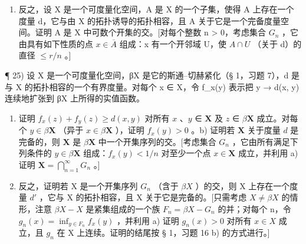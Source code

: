 \begin{enumerate}
\def\labelenumi{\alph{enumi})}
\setcounter{enumi}{1}
\tightlist
\item
  反之，设 X 是一个可度量化空间，A 是 X 的一个子集，使得 A 上存在一个度量 d，它与由 X 的拓扑诱导的拓扑相容，且 A 关于它是一个完备度量空间。证明 A 是 X 中可数个开集的交。{[}对每个整数 n \textgreater{} 0，考虑集合 \(G_{n}\) ，它由具有如下性质的点 \(x \in \overline{A}\) 组成：x 有一个开邻域 U，使 \(A \cap U\) （关于 d）的直径 \(\leqslant r/n\) 。{]}
\end{enumerate}

¶ 25) 设 X 是一个可度量化空间，βX 是它的斯通–切赫紧化（§ 1，习题 7），d 是与 X 的拓扑相容的一个有界度量。对每个 x ∈ X，令 f\_x(y) 表示把 y → d(x, y) 连续地扩张到 βX 上所得的实值函数。

\begin{enumerate}
\def\labelenumi{\alph{enumi})}
\item
  证明 \(f_{x}(z) + f_{y}(z) \geqslant d(x, y)\) 对所有 \(x\) 、\(y\) ∈ \(\mathbf{X}\) 及 \(z\) ∈ \(\beta \mathbf{X}\) 成立。对每个 \(y \in \beta \mathbf{X}\) （异于 \(x \in \beta \mathbf{X}\) ），证明 \(f_{x}(y) > 0\) 。b) 证明若 \(\mathbf{X}\) 关于度量 \(d\) 是完备的，则 \(\mathbf{X}\) 是 \(\beta \mathbf{X}\) 中一个开集序列的交。{[}考虑集合 \(G_{n}\) ，它由所有满足下列条件的 \(y \in \beta \mathbf{X}\) 组成：\(f_{x}(y) < 1 / n\) 对至少一个点 \(x \in \mathbf{X}\) 成立，并利用 a) 证明 \(\mathbf{X} = \bigcap_{n=1}^{\infty} G_{n}\) 。{]}
\item
  反之，证明若 X 是一个开集序列 \(G_{n}\) （含于 \(\beta X\) ）的交，则 X 上存在一个度量 \(d'\) ，它与 X 的拓扑相容，且 X 关于它是完备的。{[}只需考虑 \(X \neq \beta X\) 的情形，注意 \(\beta X - X\) 是紧集组成的一个族 \(F_{n} = \beta X - G_{n}\) 的并；对每个 n，令 \(g_{n}(x) = \inf_{y \in F_{n}} f_{x}(y)\) ，并利用 a) 证明 \(g_{n}(x) > 0\) 对所有 \(x \in X\) 成立，且 \(g_{n}\) 在 X 上连续。证明的结尾按 § 1，习题 16 b) 的方式进行。{]}
\end{enumerate}


